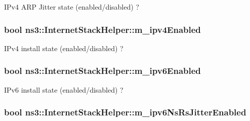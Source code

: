 I\+Pv4 A\+RP Jitter state (enabled/disabled) ? 

\subsubsection[{\texorpdfstring{m\+\_\+ipv4\+Enabled}{m_ipv4Enabled}}]{\setlength{\rightskip}{0pt plus 5cm}bool ns3\+::\+Internet\+Stack\+Helper\+::m\+\_\+ipv4\+Enabled\hspace{0.3cm}{\ttfamily [private]}}\hypertarget{classns3_1_1InternetStackHelper_a52b041bc6e084a821e6885c71d38df31}{}\label{classns3_1_1InternetStackHelper_a52b041bc6e084a821e6885c71d38df31}


I\+Pv4 install state (enabled/disabled) ? 

\subsubsection[{\texorpdfstring{m\+\_\+ipv6\+Enabled}{m_ipv6Enabled}}]{\setlength{\rightskip}{0pt plus 5cm}bool ns3\+::\+Internet\+Stack\+Helper\+::m\+\_\+ipv6\+Enabled\hspace{0.3cm}{\ttfamily [private]}}\hypertarget{classns3_1_1InternetStackHelper_a2eade9878232a41166cd0638cab7c3bf}{}\label{classns3_1_1InternetStackHelper_a2eade9878232a41166cd0638cab7c3bf}


I\+Pv6 install state (enabled/disabled) ? 

\subsubsection[{\texorpdfstring{m\+\_\+ipv6\+Ns\+Rs\+Jitter\+Enabled}{m_ipv6NsRsJitterEnabled}}]{\setlength{\rightskip}{0pt plus 5cm}bool ns3\+::\+Internet\+Stack\+Helper\+::m\+\_\+ipv6\+Ns\+Rs\+Jitter\+Enabled\hspace{0.3cm}{\ttfamily [private]}}\hypertarget{classns3_1_1InternetStackHelper_a465f1786b918e4b3b3640d958d6e3212}{}\label{classns3_1_1InternetStackHelper_a465f1786b918e4b3b3640d958d6e3212}


